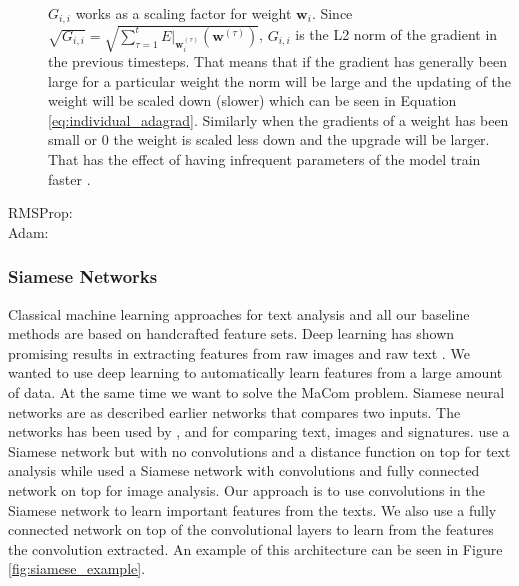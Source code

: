 \begin{description}
        $G_{i,i}$ works as a scaling factor for weight
        $\mathbf{w}_i$. Since $\sqrt{G_{i,i}} = \sqrt{\sum_{\tau=1}^t
        E|_{\mathbf{w}^{(\tau)}_i}\left(\mathbf{w}^{(\tau)}\right)}$,
        $G_{i,i}$ is the L2 norm of the gradient in the previous timesteps.
        That means that if the gradient has generally been large for a
        particular weight the norm will be large and the updating of the
        weight will be scaled down (slower) which can be seen in Equation
        \eqref{eq:individual_adagrad}. Similarly when the gradients of a weight
        has been small or 0 the weight is scaled less down and the upgrade will
        be larger. That has the effect of having infrequent parameters of the
        model train faster \cite{Duchi:2011:ASM:1953048.2021068}.


    \item[\gls{RMSProp}:]


    \item[\gls{Adam}:]


\end{description}


\subsubsection{Siamese Networks}

Classical machine learning approaches for text analysis and all our baseline
methods are based on handcrafted feature sets. Deep learning has shown
promising results in extracting features from raw images and raw text
\cite{hongxiaosunyuan}. We wanted to use deep learning to automatically learn
features from a large amount of data. At the same time we want to solve the
MaCom problem. Siamese neural networks are as described earlier networks that
compares two inputs. The networks has been used by \cite{Koch2015SiameseNN},
\cite{NIPS1993_769} and \cite{qian:2018} for comparing text, images and
signatures. \cite{qian:2018} use a Siamese network but with no convolutions and
a distance function on top for text analysis while \cite{Koch2015SiameseNN}
used a Siamese network with convolutions and fully connected network on top
for image analysis. Our approach is to use convolutions in the Siamese network
to learn important features from the texts. We also use a fully connected
network on top of the convolutional layers to learn from the features the
convolution extracted. An example of this architecture can be seen in Figure
\ref{fig:siamese_example}.

